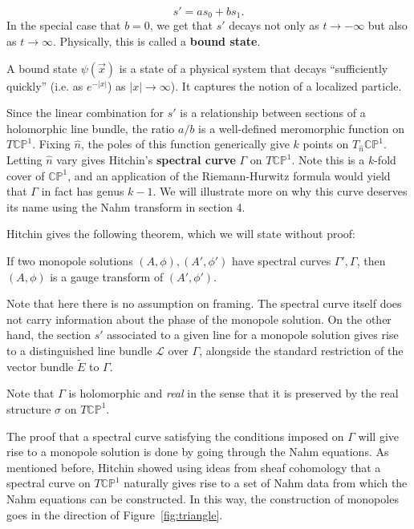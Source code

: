 	\begin{equation}
		s' = a s_0 + b s_1.
	\end{equation}
	In the special case that $b=0$, we get that $s'$ decays not only as $t \to -\infty$ but also as $t \to \infty$. Physically, this is called a \textbf{bound state}.
	\begin{phys}
		A bound state $\psi(\vec x)$ is a state of a physical system that decays ``sufficiently quickly'' (i.e. as $e^{-|x|}$) as $|x| \to \infty$). It captures the notion of a localized particle. 
	\end{phys}
	Since the linear combination for $s'$ is a relationship between sections of a holomorphic line bundle, the ratio $a/b$ is a well-defined meromorphic function on $T \mathbb{CP}^1$. Fixing $\hat n$, the poles of this function generically give $k$ points on $T_{\hat n} \mathbb{CP}^1$. Letting $\hat n$ vary gives Hitchin's \textbf{spectral curve} $\Gamma$ on $T \mathbb {CP}^1$. Note this is a $k$-fold cover of $\mathbb{CP}^1$, and an application of the Riemann-Hurwitz formula would yield that $\Gamma$ in fact has genus $k-1$. We will illustrate more on why this curve deserves its name using the Nahm transform in section 4.
	
	Hitchin gives the following theorem, which we will state without proof:
	\begin{theorem}[Hitchin]
		If two monopole solutions $(A, \phi), (A', \phi')$ have spectral curves $\Gamma', \Gamma$, then $(A, \phi)$ is a gauge transform of $(A', \phi')$.
	\end{theorem}
	Note that here there is no assumption on framing. The spectral curve itself does not carry information about the phase of the monopole solution. On the other hand, the section $s'$ associated to a given line for a monopole solution gives rise to a distinguished line bundle $\mathcal L$ over $\Gamma$, alongside the standard restriction of the vector bundle $\tilde E$ to $\Gamma$.
	
	Note that $\Gamma$ is holomorphic and \emph{real} in the sense that it is preserved by the real structure $\sigma$ on $T\mathbb{CP}^1$.
	
	The proof that a spectral curve satisfying the conditions imposed on $\Gamma$ will give rise to a monopole solution is done by going through the Nahm equations. As mentioned before, Hitchin \cite{hitchin1983} showed using ideas from sheaf cohomology that a spectral curve on $T \mathbb{CP}^1$ naturally gives rise to a set of Nahm data from which the Nahm equations can be constructed. In this way, the construction of monopoles goes in the direction of Figure~\ref{fig:triangle}.
	
